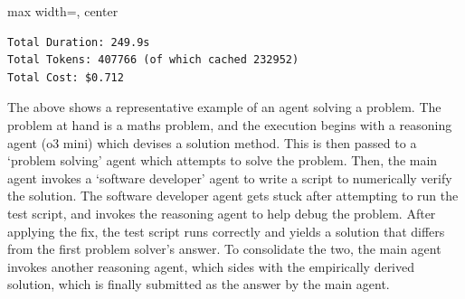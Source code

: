 {\begin{adjustbox}{max width=\linewidth, center}
\begin{tracebox}
\begin{verbatim}
Total Duration: 249.9s
Total Tokens: 407766 (of which cached 232952)
Total Cost: $0.712
\end{verbatim}
\end{tracebox}
\end{adjustbox}
}

The above shows a representative example of an agent solving a problem. The problem at hand is a maths problem, and the execution begins with a reasoning agent (o3 mini) which devises a solution method. This is then passed to a `problem solving' agent which attempts to solve the problem. Then, the main agent invokes a `software developer' agent to write a script to numerically verify the solution. The software developer agent gets stuck after attempting to run the test script, and invokes the reasoning agent to help debug the problem. After applying the fix, the test script runs correctly and yields a solution that differs from the first problem solver's answer. To consolidate the two, the main agent invokes another reasoning agent, which sides with the empirically derived solution, which is finally submitted as the answer by the main agent.

